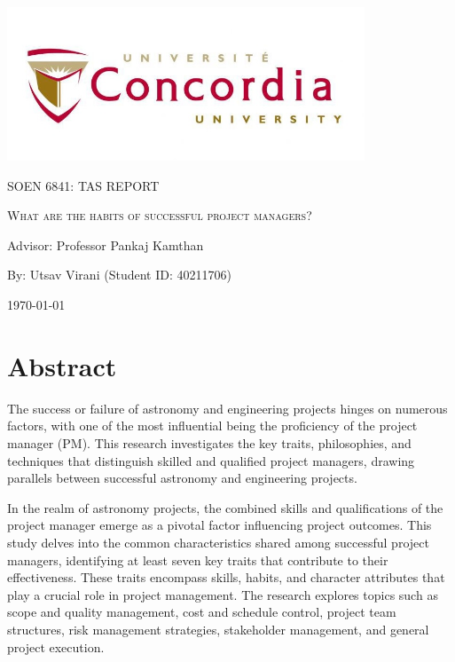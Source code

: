 \documentclass{article}
\begin{document}
\begin{titlepage}
    \centering
    \includegraphics[width=0.8\textwidth]{image.jpeg}\par %
     \vspace{2cm}
    {\scshape\Large SOEN 6841: TAS REPORT \par}
    \vspace{1.5cm}
    {\scshape\Huge What are the habits of successful project managers?\par}
    \vspace{1.5cm}
    \vspace{1.5cm}
    {\large Advisor: Professor Pankaj Kamthan\par}
    \vspace{1.5cm}
    {\large By: Utsav Virani (Student ID: 40211706)\par}
    \vspace{1cm}
    {\large \today\par}
\end{titlepage}

\tableofcontents

\newpage

\section{Abstract}
The success or failure of astronomy and engineering projects hinges on numerous factors, with one of the most influential being the proficiency of the project manager (PM). This research investigates the key traits, philosophies, and techniques that distinguish skilled and qualified project managers, drawing parallels between successful astronomy and engineering projects\cite{The seven habits of highly effective project managers}.

In the realm of astronomy projects, the combined skills and qualifications of the project manager emerge as a pivotal factor influencing project outcomes. This study delves into the common characteristics shared among successful project managers, identifying at least seven key traits that contribute to their effectiveness. These traits encompass skills, habits, and character attributes that play a crucial role in project management. The research explores topics such as scope and quality management, cost and schedule control, project team structures, risk management strategies, stakeholder management, and general project execution.
\end{document}
